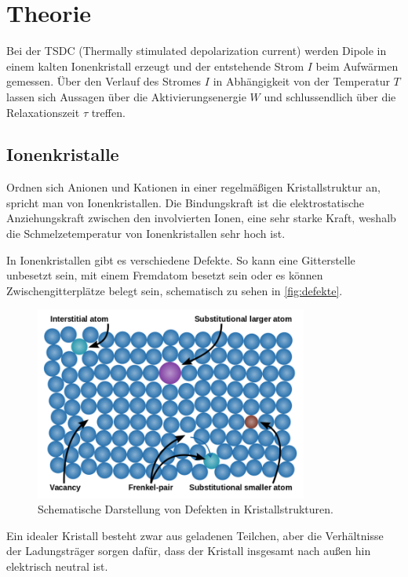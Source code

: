 \section{Theorie}
\label{sec:Theorie}

Bei der TSDC (Thermally stimulated depolarization current) werden Dipole in einem kalten Ionenkristall erzeugt
und der entstehende Strom $I$ beim Aufwärmen gemessen. Über den Verlauf des Stromes $I$ in Abhängigkeit von der Temperatur $T$
 lassen sich Aussagen über die Aktivierungsenergie $W$ und schlussendlich über die Relaxationszeit $\tau$ treffen.

\subsection{Ionenkristalle}
Ordnen sich Anionen und Kationen in einer regelmäßigen Kristallstruktur an, spricht man von Ionenkristallen.
Die Bindungskraft ist die elektrostatische Anziehungskraft zwischen den involvierten Ionen, eine sehr starke Kraft, weshalb die Schmelzetemperatur 
von Ionenkristallen sehr hoch ist. 

In Ionenkristallen gibt es verschiedene Defekte. So kann eine Gitterstelle unbesetzt sein, mit einem Fremdatom besetzt sein oder es können Zwischengitterplätze belegt sein, schematisch zu sehen in
\autoref{fig:defekte}.

\begin{figure}[H]
    \centering
    \includegraphics[width=0.8\textwidth]{v48/Bilder/Difference-Between-Point-Defect-and-Line-Defect-fig-1.png}
    \caption{Schematische Darstellung von Defekten in Kristallstrukturen.}
    \label{fig:defekte}
\end{figure}

Ein idealer Kristall besteht zwar aus geladenen Teilchen, aber die Verhältnisse der Ladungsträger sorgen dafür, dass der Kristall
insgesamt nach außen hin elektrisch neutral ist.

